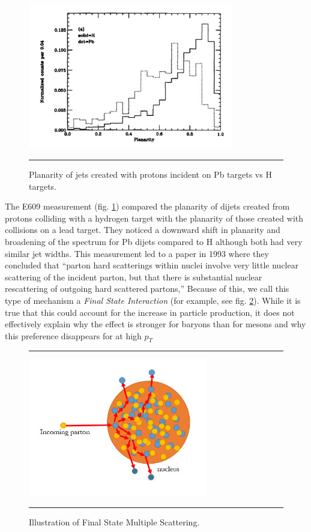\begin{figure}[htbp!]
  \centering
    \includegraphics[width=0.8\textwidth]{prevplots/e609planarity.jpg}
    \rule{35em}{0.5pt}
  \caption[Planarity of jets created with protons incident on Pb targets vs H targets.]{Planarity of jets created with protons incident on Pb targets vs H targets.}
  \label{fig:e609planarity}
\end{figure}
The E609 measurement (fig. \ref{fig:e609planarity}) compared the planarity of dijets created from protons colliding with a hydrogen target with the planarity of those created with collisions on a lead target. They noticed a downward shift in planarity and broadening of the spectrum for Pb dijets compared to H although both had very similar jet widths. This measurement led to a paper in 1993 where they concluded that ``parton hard scatterings within nuclei involve very little nuclear scattering of the incident parton, but that there is substantial nuclear rescattering of outgoing hard scattered partons\citep{PhysRevLett.70.143},'' Because of this, we call this type of mechanism a \textit{Final State Interaction} (for example, see fig. \ref{fig:FSIscattering}). While it is true that this could account for the increase in particle production, it does not effectively explain why the effect is stronger for baryons than for mesons and why this preference disappears for at high $p_{T}$
\begin{figure}[htbp!]
  \centering
    \rule{35em}{0.5pt}
    \includegraphics[width=0.7\textwidth]{Figures/FSIscattering.jpg}

  \caption[Illustration of Final State Multiple Scattering]{Illustration of Final State Multiple Scattering.}
  \label{fig:FSIscattering}
    \rule{35em}{0.5pt}
\end{figure} 

